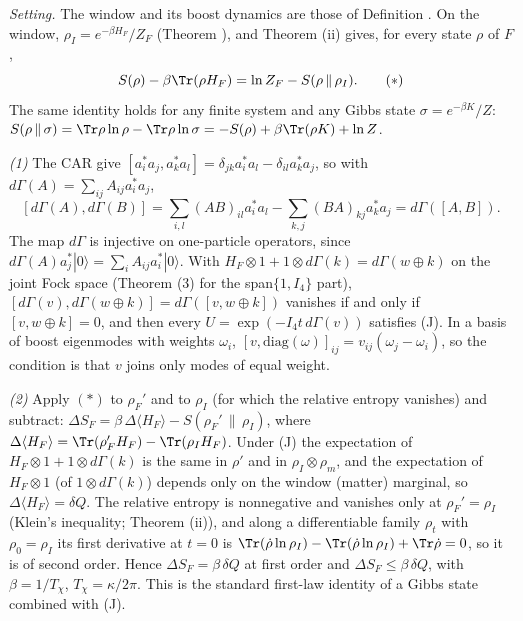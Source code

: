 \emph{Setting.} The window and its boost dynamics are those of Definition . On the window, $\rho_{I} = e^{-\beta H_{F}}/Z_{F}$ (Theorem ), and Theorem (ii) gives, for every state $\rho$ of $F$,
\[
S(\rho) - \beta\Tr(\rho H_{F}) = \ln Z_{F} - S(\rho\,\|\,\rho_{I}). \tag{$*$}
\]
The same identity holds for any finite system and any Gibbs state $\sigma = e^{-\beta K}/Z$: $S(\rho\,\|\,\sigma) = \Tr\rho\ln\rho - \Tr\rho\ln\sigma = -S(\rho) + \beta\Tr(\rho K) + \ln Z$.

\emph{(1)} The CAR give $[a_{i}^{*}a_{j}, a_{k}^{*}a_{l}] = \delta_{jk}a_{i}^{*}a_{l} - \delta_{il}a_{k}^{*}a_{j}$, so with $d\Gamma(A) = \sum_{ij}A_{ij}a_{i}^{*}a_{j}$,
\[
[d\Gamma(A), d\Gamma(B)] = \sum_{i,l}(AB)_{il}a_{i}^{*}a_{l} - \sum_{k,j}(BA)_{kj}a_{k}^{*}a_{j} = d\Gamma([A, B]).
\]
The map $d\Gamma$ is injective on one-particle operators, since $d\Gamma(A)a_{j}^{*}|0\rangle = \sum_{i}A_{ij}a_{i}^{*}|0\rangle$. With $H_{F} \otimes 1 + 1 \otimes d\Gamma(k) = d\Gamma(w \oplus k)$ on the joint Fock space (Theorem (3) for the span$\{1, I_{4}\}$ part), $[d\Gamma(v), d\Gamma(w \oplus k)] = d\Gamma([v, w \oplus k])$ vanishes if and only if $[v, w \oplus k] = 0$, and then every $U = \exp(-I_{4}t\,d\Gamma(v))$ satisfies (J). In a basis of boost eigenmodes with weights $\omega_{i}$, $[v, \mathrm{diag}(\omega)]_{ij} = v_{ij}(\omega_{j} - \omega_{i})$, so the condition is that $v$ joins only modes of equal weight.

\emph{(2)} Apply $(*)$ to $\rho_{F}'$ and to $\rho_{I}$ (for which the relative entropy vanishes) and subtract: $\Delta S_{F} = \beta\,\Delta\langle H_{F}\rangle - S(\rho_{F}'\,\|\,\rho_{I})$, where $\Delta\langle H_{F}\rangle = \Tr(\rho_{F}'H_{F}) - \Tr(\rho_{I}H_{F})$. Under (J) the expectation of $H_{F}\otimes 1 + 1\otimes d\Gamma(k)$ is the same in $\rho'$ and in $\rho_{I}\otimes\rho_{m}$, and the expectation of $H_{F}\otimes 1$ (of $1\otimes d\Gamma(k)$) depends only on the window (matter) marginal, so $\Delta\langle H_{F}\rangle = \delta Q$. The relative entropy is nonnegative and vanishes only at $\rho_{F}' = \rho_{I}$ (Klein's inequality; Theorem (ii)), and along a differentiable family $\rho_{t}$ with $\rho_{0} = \rho_{I}$ its first derivative at $t = 0$ is $\Tr(\dot\rho\ln\rho_{I}) - \Tr(\dot\rho\ln\rho_{I}) + \Tr\dot\rho = 0$, so it is of second order. Hence $\Delta S_{F} = \beta\,\delta Q$ at first order and $\Delta S_{F} \le \beta\,\delta Q$, with $\beta = 1/T_{\chi}$, $T_{\chi} = \kappa/2\pi$. This is the standard first-law identity of a Gibbs state combined with (J).

